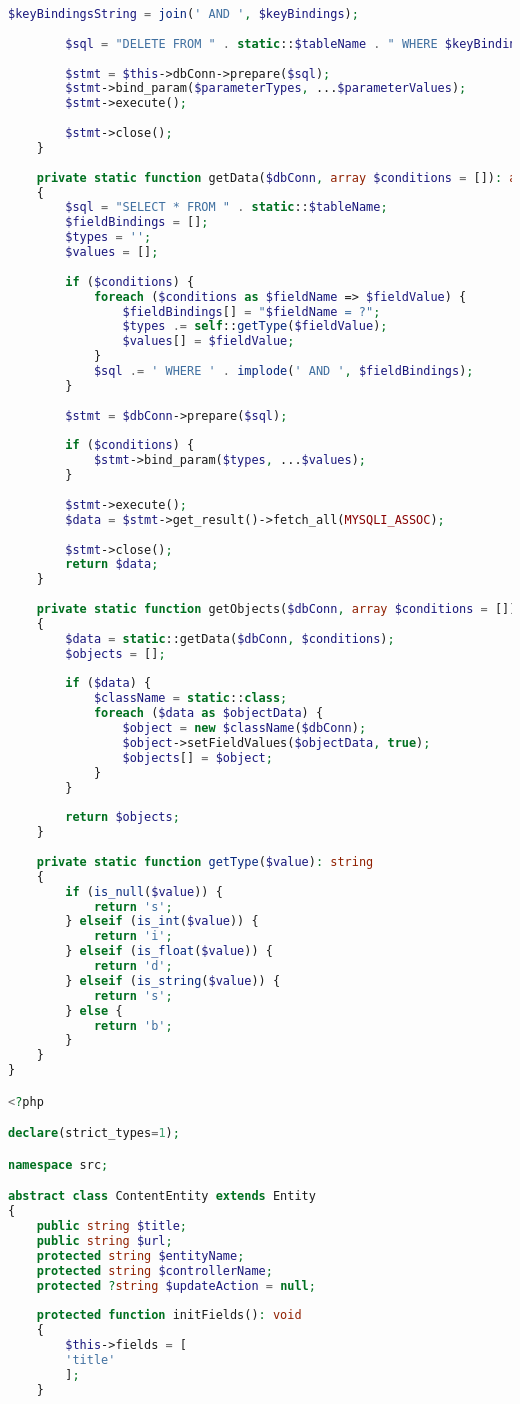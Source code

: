 \begin{lstlisting}[language=PHP, frame=none]
		$keyBindingsString = join(' AND ', $keyBindings);
		
		$sql = "DELETE FROM " . static::$tableName . " WHERE $keyBindingsString";
		
		$stmt = $this->dbConn->prepare($sql);
		$stmt->bind_param($parameterTypes, ...$parameterValues);
		$stmt->execute();
		
		$stmt->close();
	}
	
	private static function getData($dbConn, array $conditions = []): array
	{
		$sql = "SELECT * FROM " . static::$tableName;
		$fieldBindings = [];
		$types = '';
		$values = [];
		
		if ($conditions) {
			foreach ($conditions as $fieldName => $fieldValue) {
				$fieldBindings[] = "$fieldName = ?";
				$types .= self::getType($fieldValue);
				$values[] = $fieldValue;
			}
			$sql .= ' WHERE ' . implode(' AND ', $fieldBindings);
		}
		
		$stmt = $dbConn->prepare($sql);
		
		if ($conditions) {
			$stmt->bind_param($types, ...$values);
		}
		
		$stmt->execute();
		$data = $stmt->get_result()->fetch_all(MYSQLI_ASSOC);
		
		$stmt->close();
		return $data;
	}
	
	private static function getObjects($dbConn, array $conditions = []): array
	{
		$data = static::getData($dbConn, $conditions);
		$objects = [];
		
		if ($data) {
			$className = static::class;
			foreach ($data as $objectData) {
				$object = new $className($dbConn);
				$object->setFieldValues($objectData, true);
				$objects[] = $object;
			}
		}
		
		return $objects;
	}
	
	private static function getType($value): string
	{
		if (is_null($value)) {
			return 's';
		} elseif (is_int($value)) {
			return 'i';
		} elseif (is_float($value)) {
			return 'd';
		} elseif (is_string($value)) {
			return 's';
		} else {
			return 'b';
		}
	}
}

<?php

declare(strict_types=1);

namespace src;

abstract class ContentEntity extends Entity
{
	public string $title;
	public string $url;
	protected string $entityName;
	protected string $controllerName;
	protected ?string $updateAction = null;
	
	protected function initFields(): void
	{
		$this->fields = [
		'title'
		];
	}
	

\end{lstlisting}
